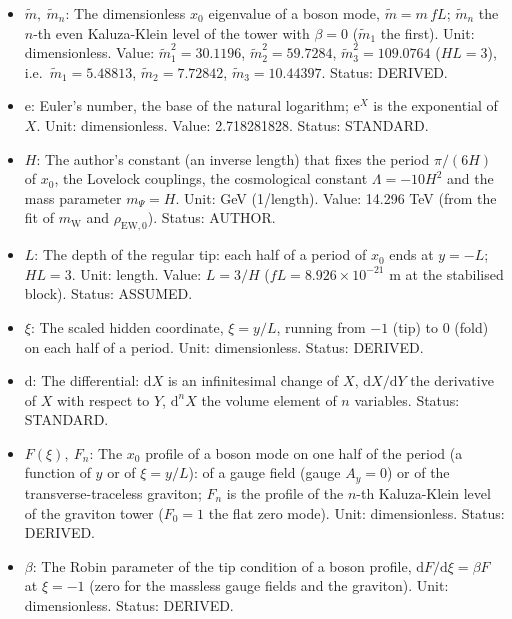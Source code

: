 \documentclass[
  10pt,
]{article}
\providecommand{\tightlist}{%
  \setlength{\itemsep}{0pt}\setlength{\parskip}{0pt}}
\begin{document}
\begin{itemize}
\tightlist
\item
  \(\tilde m,\ \tilde m_n\): The dimensionless \(x_0\) eigenvalue of a
  boson mode, \(\tilde m = m\,fL\); \(\tilde m_n\) the \(n\)-th even
  Kaluza-Klein level of the tower with \(\beta = 0\) (\(\tilde m_1\) the
  first). Unit: dimensionless. Value: \(\tilde m_1^2 = 30.1196\),
  \(\tilde m_2^2 = 59.7284\), \(\tilde m_3^2 = 109.0764\) (\(HL = 3\)),
  i.e.~\(\tilde m_1 = 5.48813\), \(\tilde m_2 = 7.72842\),
  \(\tilde m_3 = 10.44397\). Status: DERIVED.
\item
  \(\mathrm{e}\): Euler's number, the base of the natural logarithm;
  \(\mathrm{e}^{X}\) is the exponential of \(X\). Unit: dimensionless.
  Value: 2.718281828. Status: STANDARD.
\item
  \(H\): The author's constant (an inverse length) that fixes the period
  \(\pi/(6H)\) of \(x_0\), the Lovelock couplings, the cosmological
  constant \(\Lambda = -10H^2\) and the mass parameter \(m_\Psi = H\).
  Unit: GeV (1/length). Value: 14.296 TeV (from the fit of
  \(m_{\mathrm{W}}\) and \(\rho_{\mathrm{EW},0}\)). Status: AUTHOR.
\item
  \(L\): The depth of the regular tip: each half of a period of \(x_0\)
  ends at \(y = -L\); \(HL = 3\). Unit: length. Value: \(L = 3/H\)
  (\(fL = 8.926\times10^{-21}\) m at the stabilised block). Status:
  ASSUMED.
\item
  \(\xi\): The scaled hidden coordinate, \(\xi = y/L\), running from
  \(-1\) (tip) to \(0\) (fold) on each half of a period. Unit:
  dimensionless. Status: DERIVED.
\item
  \(\mathrm{d}\): The differential: \(\mathrm{d}X\) is an infinitesimal
  change of \(X\), \(\mathrm{d}X/\mathrm{d}Y\) the derivative of \(X\)
  with respect to \(Y\), \(\mathrm{d}^nX\) the volume element of \(n\)
  variables. Status: STANDARD.
\item
  \(F(\xi),\ F_n\): The \(x_0\) profile of a boson mode on one half of
  the period (a function of \(y\) or of \(\xi = y/L\)): of a gauge field
  (gauge \(A_y = 0\)) or of the transverse-traceless graviton; \(F_n\)
  is the profile of the \(n\)-th Kaluza-Klein level of the graviton
  tower (\(F_0 = 1\) the flat zero mode). Unit: dimensionless. Status:
  DERIVED.
\item
  \(\beta\): The Robin parameter of the tip condition of a boson
  profile, \(\mathrm{d}F/\mathrm{d}\xi = \beta F\) at \(\xi = -1\) (zero
  for the massless gauge fields and the graviton). Unit: dimensionless.
  Status: DERIVED.
\end{itemize}
\end{document}
